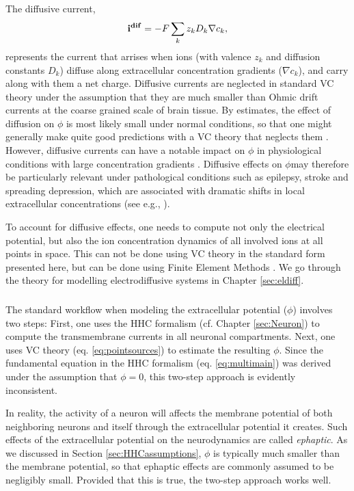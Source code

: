The diffusive current,
\begin{equation}
{\bf i^{dif}} = -F \sum_k z_k D_k \nabla c_k,
\label{eq:idif}
\end{equation}
represents the current that arrises when ions (with valence $z_k$ and diffusion constants $D_k$) diffuse along extracellular concentration gradients ($\nabla c_k$), and carry along with them a net charge. Diffusive currents are neglected in standard VC theory under the assumption that they are much smaller than Ohmic drift currents at the coarse grained scale of brain tissue. By estimates, the effect of diffusion on $\phi$ is most likely small under normal conditions, 
so that one might generally make quite good predictions with a VC theory that neglects them \cite{Halnes2016, Gratiy2017}. 
However, diffusive currents can have a notable impact on $\phi$ in physiological conditions with large concentration gradients \cite{Halnes2016, Gratiy2017}. Diffusive effects on $\phi$may therefore be particularly relevant under pathological conditions such as epilepsy, stroke and spreading depression, which are associated with dramatic shifts in local extracellular concentrations (see e.g.,  \cite{Somjen2001, Frohlich2008, Wei2014, Ayata2015}). 

To account for diffusive effects, one needs to compute not only the electrical potential, but also the ion concentration dynamics of all involved ions at all points in space. This can not be done using VC theory in the standard form presented here, but can be done using Finite Element Methods \cite{Solbra2018}. We go through the theory for modelling electrodiffusive systems in Chapter \ref{sec:eldiff}.


\subsubsection{ }
\label{sec:noephaptic}
The standard workflow when modeling the extracellular potential ($\phi$) involves two steps: First, one uses the HHC formalism (cf. Chapter \ref{sec:Neuron}) to compute the transmembrane currents in all neuronal compartments. Next, one uses VC theory (eq. \ref{eq:pointsources}) to estimate the resulting $\phi$. Since the fundamental equation in the HHC formalism (eq. \ref{eq:multimain}) was derived under the assumption that $\phi=0$, this two-step approach is evidently inconsistent. 

In reality, the activity of a neuron will affects the membrane potential of both neighboring neurons and itself through the extracellular potential it creates. Such effects of the extracellular potential on the neurodynamics are called \textit{ephaptic}. As we discussed in Section \ref{sec:HHCassumptions}, $\phi$ is typically much smaller than the membrane potential, so that ephaptic effects are commonly assumed to be negligibly small. Provided that this is true, the two-step approach works well. 

